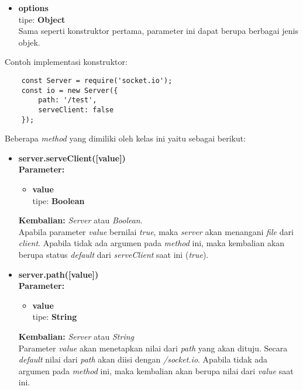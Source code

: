 \begin{enumerate}
\begin{itemize}
		\begin{itemize}
			\item \textbf{options} \\ tipe: \textbf{Object} \\ Sama seperti konstruktor pertama, parameter ini dapat berupa berbagai jenis objek.
		\end{itemize}
	
	Contoh implementasi konstruktor:
	
	\begin{lstlisting}
	const Server = require('socket.io');
	const io = new Server({
		path: '/test',
		serveClient: false
	});
	\end{lstlisting}
	
	\end{itemize}

	Beberapa \textit{method} yang dimiliki oleh kelas ini yaitu sebagai berikut: 
	
		\begin{itemize}
			\item \textbf{server.serveClient([value])} \\ 
			\textbf{Parameter:}
			\begin{itemize}
				\item \textbf{value} \\ tipe: \textbf{Boolean}
			\end{itemize}
			\textbf{Kembalian:} \textit{Server} atau \textit{Boolean}. \\
			Apabila parameter \textit{value} bernilai \textit{true}, maka \textit{server} akan menangani \textit{file} dari \textit{client}. Apabila tidak ada argumen pada \textit{method} ini, maka kembalian akan berupa status \textit{default} dari \textit{serveClient} saat ini (\textit{true}).
			
			\item \textbf{server.path([value])} \\
			\textbf{Parameter:}
			\begin{itemize}
				\item \textbf{value} \\ tipe: \textbf{String}
			\end{itemize}
			\textbf{Kembalian:} \textit{Server} atau \textit{String} \\
			Parameter \textit{value} akan menetapkan nilai dari \textit{path} yang akan dituju. Secara \textit{default} nilai dari \textit{path} akan diisi dengan \textit{/socket.io}. Apabila tidak ada argumen pada \textit{method} ini, maka kembalian akan berupa nilai dari \textit{value} saat ini.
			

\end{itemize}
\end{enumerate}
